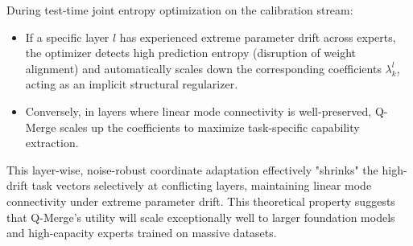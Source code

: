During test-time joint entropy optimization on the calibration stream:
\begin{itemize}
    \item If a specific layer $l$ has experienced extreme parameter drift across experts, the optimizer detects high prediction entropy (disruption of weight alignment) and automatically scales down the corresponding coefficients $\lambda^l_k$, acting as an implicit structural regularizer.
    \item Conversely, in layers where linear mode connectivity is well-preserved, Q-Merge scales up the coefficients to maximize task-specific capability extraction.
\end{itemize}

This layer-wise, noise-robust coordinate adaptation effectively "shrinks" the high-drift task vectors selectively at conflicting layers, maintaining linear mode connectivity under extreme parameter drift. This theoretical property suggests that Q-Merge's utility will scale exceptionally well to larger foundation models and high-capacity experts trained on massive datasets.
